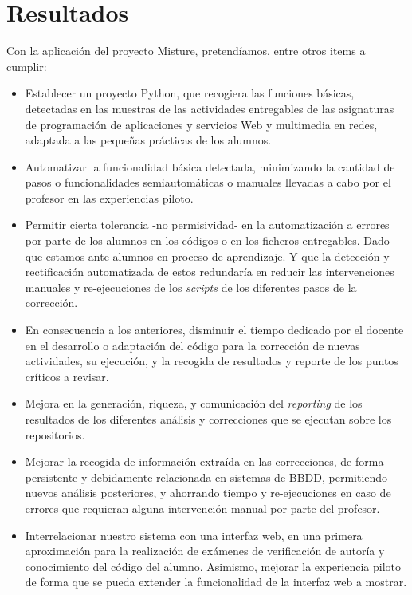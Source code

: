 \cleardoublepage
\chapter{Resultados}
\label{chap:resultados}

Con la aplicación del proyecto Misture, pretendíamos, entre otros items a cumplir:\\


\begin{itemize}
\item Establecer un proyecto Python, que recogiera las funciones básicas, detectadas en las muestras de las actividades entregables de las asignaturas de programación de aplicaciones y servicios Web y multimedia en redes, adaptada a las pequeñas prácticas de los alumnos.\\ 

\item Automatizar la funcionalidad básica detectada, minimizando la cantidad de pasos o funcionalidades semiautomáticas o manuales llevadas a cabo por el profesor en las experiencias piloto.\\

\item Permitir cierta tolerancia -no permisividad- en la automatización a errores por parte de los alumnos en los códigos o en los ficheros entregables. Dado que estamos ante alumnos en proceso de aprendizaje. Y que la detección y rectificación automatizada de estos redundaría en reducir las intervenciones manuales y re-ejecuciones de los \textit{scripts} de los diferentes pasos de la corrección.\\

\item En consecuencia a los anteriores, disminuir el tiempo dedicado por el docente en el desarrollo o adaptación del código para la corrección de nuevas actividades, su ejecución, y la recogida de resultados y reporte de los puntos críticos a revisar.\\

\item Mejora en la generación, riqueza, y comunicación del \textit{reporting} de los resultados de los diferentes análisis y correcciones que se ejecutan sobre los repositorios.\\

\item Mejorar la recogida de información extraída en las correcciones, de forma persistente y debidamente relacionada en sistemas de BBDD, permitiendo nuevos análisis posteriores, y ahorrando tiempo y re-ejecuciones en caso de errores que requieran alguna intervención manual por parte del profesor.\\

\item Interrelacionar nuestro sistema con una interfaz web, en una primera aproximación para la realización de exámenes de verificación de autoría y conocimiento del código del alumno. Asimismo, mejorar la experiencia piloto de forma que se pueda extender la funcionalidad de la interfaz web a mostrar.
\end{itemize}

